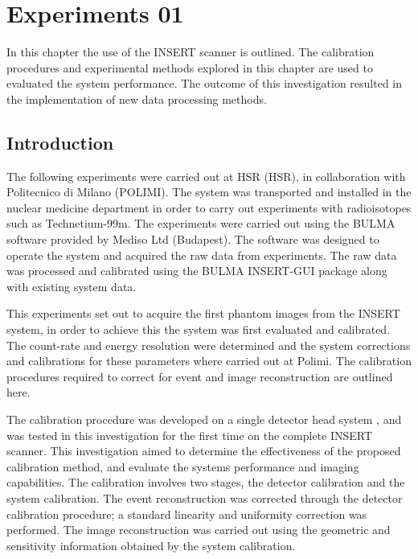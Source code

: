 \chapter{Experiments 01}
\label{Milan}



In this chapter the use of the \acrshort{INSERT} scanner is outlined. The calibration procedures and experimental methods explored in this chapter are used to evaluated the system performance. The outcome of this investigation resulted in the implementation of new data processing methods. 

\section{Introduction}
The following experiments were carried out at \acrlong{HSR} (\acrshort{HSR}), in collaboration with Politecnico di Milano (POLIMI). The system was transported and installed in the nuclear medicine department in order to carry out experiments with radioisotopes such as Technetium-99m. The experiments were carried out using the BULMA software provided by Mediso Ltd (Budapest). The software was designed to operate the system and acquired the raw data from experiments. The raw data was processed and calibrated using the BULMA INSERT-GUI package along with existing system data. 

This experiments set out to acquire the first phantom images from the \acrshort{INSERT} system, in order to achieve this the system was first evaluated and calibrated. The count-rate and energy resolution were determined and the system corrections and calibrations for these parameters where carried out at Polimi. The calibration procedures required to correct for event and image reconstruction are outlined here.

The calibration procedure was developed on a single detector head system \cite{DebCal}, and was tested in this investigation for the first time on the complete \acrshort{INSERT} scanner. This investigation aimed to determine the effectiveness of the proposed calibration method, and evaluate the systems performance and imaging capabilities. The calibration involves two stages, the detector calibration and the system calibration. The event reconstruction was corrected through the detector calibration procedure; a standard linearity and uniformity correction was performed. The image reconstruction was carried out using the geometric and sensitivity information obtained by the system calibration.

